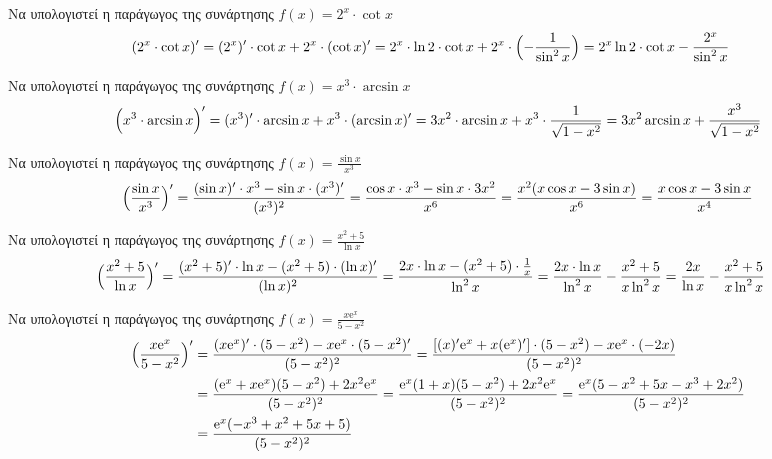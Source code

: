 \documentclass[a4paper,table]{report}
\begin{document}
  \begin{exercise} Να υπολογιστεί η παράγωγος της συνάρτησης 
    $ f(x) = 2^{x} \cdot \cot{x} $
    \begin{align*}
      (2^{x}\cdot \cot{x})' 
      &= (2^{x})' \cdot \cot{x} + 2^{x} \cdot (\cot{x} )' =
      2^{x}\cdot \ln{2} \cdot \cot{x} + 2^{x}\cdot \Bigl(- \frac{1}{\sin^{2}{x}}\Bigr) = 
      2^{x} \ln{2} \cdot \cot{x} - \frac{2^{x}}{\sin^{2}{x}} 
    \end{align*}
  \end{exercise}

  \begin{exercise} Να υπολογιστεί η παράγωγος της συνάρτησης 
    $ f(x) = x^{3} \cdot \arcsin{x} $
    \[
      \Bigl(x^{3}\cdot \arcsin{x}\Bigr)' = (x^{3})' \cdot \arcsin{x} + x^{3} \cdot (\arcsin{x} )' = 
      3x^{2} \cdot \arcsin{x} + x^{3} \cdot \frac{1}{\sqrt{1-x^{2}}} = 3x^{2} \arcsin{x}
      + \frac{x^{3}}{\sqrt{1 - x^{2}}} 
    \]
  \end{exercise}

  \begin{exercise} Να υπολογιστεί η παράγωγος της συνάρτησης 
    $ f(x) = \frac{\sin{x}}{x^{3}} $
    \[
      \Bigl(\frac{\sin{x}}{x^{3}} \Bigr)' = \frac{(\sin{x} )' \cdot x^{3}- \sin{x} \cdot
      (x^{3})'}{(x^{3})^{2}} = \frac{\cos{x} \cdot x^{3}- \sin{x} \cdot 3x^{2}}{x^{6}} = 
      \frac{x^{2}(x \cos{x} - 3 \sin{x})}{x^{6}} = \frac{x \cos{x} - 3 \sin{x}}{x^{4}}
    \]  
  \end{exercise}

  \begin{exercise} Να υπολογιστεί η παράγωγος της συνάρτησης 
    $ f(x) = \frac{x^{2}+5}{\ln{x}} $
    \begin{align*}
      \Bigl(\frac{x^{2}+5}{\ln{x}} \Bigr)' 
    & = \frac{(x^{2}+5)'\cdot \ln{x} - (x^{2}+5)\cdot
      (\ln{x} )'}{(\ln{x} )^{2}} = \frac{2x \cdot \ln{x} - (x^{2}+5) \cdot
    \frac{1}{x}}{\ln^{2}{x}} = \frac{2x \cdot \ln{x}}{\ln^{2}{x}} - \frac{x^{2}+5}{x
  \ln^{2}{x}} = \frac{2x}{\ln{x}} - \frac{x^{2}+5}{x \ln^{2}{x}} 
    \end{align*}
  \end{exercise}

  \begin{exercise} Να υπολογιστεί η παράγωγος της συνάρτησης 
    $ f(x) = \frac{x \mathrm{e}^{x}}{5-x^{2}} $
    \begin{align*}
      \Bigl(\frac{x \mathrm{e}^{x}}{5-x^{2}} \Bigr)' 
    &= \frac{(x \mathrm{e}^{x} )'\cdot
    (5-x^{2})- x \mathrm{e}^{x} \cdot (5-x^{2})'}{(5-x^{2})^{2}} = \frac{[(x)'
    \mathrm{e}^{x} + x( \mathrm{e}^{x} )']\cdot (5-x^{2}) - x \mathrm{e}^{x}\cdot 
  (-2x)}{(5-x^{2})^{2}} \\ 
    &= \frac{(\mathrm{e}^{x} + x \mathrm{e}^{x})(5-x^{2})+2x^{2} 
    \mathrm{e}^{x}}{(5-x^{2})^{2}} 
    = \frac{\mathrm{e}^{x} (1+x)(5-x^{2})+2x^{2} \mathrm{e}^{x}}{(5-x^{2})^{2}} 
    = \frac{\mathrm{e}^{x} (5-x^{2}+5x-x^{3}+2x^{2})}{(5-x^{2})^{2}} \\
    &= \frac{\mathrm{e}^{x} (-x^{3}+x^{2}+5x+5)}{(5-x^{2})^{2}} 
    \end{align*}
  \end{exercise}
\end{document}
